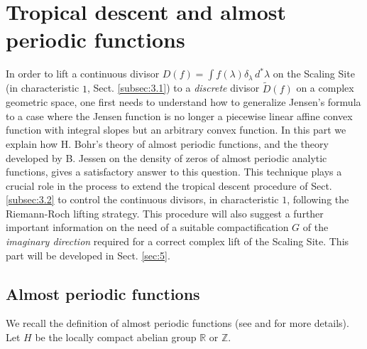 \documentclass[graybox, envcountsect%
]{svmult}
\def\R{{\mathbb R}}
\def\Z{{\mathbb Z}}
\begin{document}
\section{Tropical descent and almost periodic functions}\label{sec:4}

In order to lift a continuous divisor $D(f)=\int f(\lambda) \delta_{\lambda}\, d^*\lambda$ on  the Scaling Site (in characteristic $1$, Sect. \ref{subsec:3.1}) to a \emph{discrete} divisor $\tilde D(f)$ on a complex geometric  space,  one first needs to understand how to generalize Jensen's formula to a case where the Jensen function is no longer a piecewise linear affine convex function with integral slopes but  an arbitrary convex function. \newline
In this part we explain how H. Bohr's theory of almost periodic functions, and the theory developed by B. Jessen on the density of zeros of almost periodic analytic functions, gives a satisfactory answer to this question. This technique  plays a crucial role in the process to extend the tropical descent procedure of Sect. \ref{subsec:3.2} to control the  continuous divisors, in characteristic $1$, following the Riemann-Roch lifting strategy. This procedure will also suggest a further important information on the need of a suitable compactification $G$ of the {\em imaginary direction} required for a correct complex lift of the Scaling Site. This part  will be developed  in Sect. \ref{sec:5}.

\subsection{Almost periodic functions} \label{subsect:4.1}

We recall the definition of almost periodic functions (see \cite{bohr}  and \cite{Besicovitch} for more details). Let $H$ be the locally compact abelian group $\R$ or $\Z$.
\end{document}
